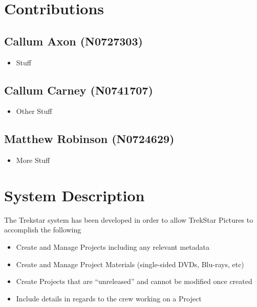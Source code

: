 \documentclass[
  english,
  a4paper,
,tablecaptionabove
]{scrartcl}
\providecommand{\tightlist}{%
  \setlength{\itemsep}{0pt}\setlength{\parskip}{0pt}}
\begin{document}
\newpage

\hypertarget{contributions}{%
\section{Contributions}\label{contributions}}

\hypertarget{callum-axon-n0727303}{%
\subsection{Callum Axon (N0727303)}\label{callum-axon-n0727303}}

\begin{itemize}
\tightlist
\item
  Stuff
\end{itemize}

\hypertarget{callum-carney-n0741707}{%
\subsection{Callum Carney (N0741707)}\label{callum-carney-n0741707}}

\begin{itemize}
\tightlist
\item
  Other Stuff
\end{itemize}

\hypertarget{matthew-robinson-n0724629}{%
\subsection{Matthew Robinson
(N0724629)}\label{matthew-robinson-n0724629}}

\begin{itemize}
\tightlist
\item
  More Stuff
\end{itemize}

\newpage

\hypertarget{system-description}{%
\section{System Description}\label{system-description}}

The Trekstar system has been developed in order to allow TrekStar
Pictures to accomplish the following

\begin{itemize}
\tightlist
\item
  Create and Manage Projects including any relevant metadata
\item
  Create and Manage Project Materials (single-sided DVDs, Blu-rays, etc)
\item
  Create Projects that are \enquote{unreleased} and cannot be modified
  once created
\item
  Include details in regards to the crew working on a Project
\end{itemize}
\end{document}
